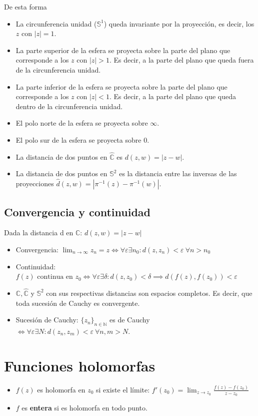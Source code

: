 \documentclass[paper=a4, fontsize=11pt]{scrartcl}
\numberwithin{equation}{section}
\numberwithin{figure}{section}
\numberwithin{table}{section}
\begin{document}
De esta forma
\begin{itemize}
\item La circunferencia unidad ($\mathbb{S}^1$) queda invariante por la proyección, es decir, los $z$ con $|z|=1$.
\item La parte superior de la esfera se proyecta sobre la parte del plano que corresponde a los $z$ con $|z|>1$. Es decir, a la parte del plano que queda fuera de la circunferencia unidad.
\item La parte inferior de la esfera se proyecta sobre la parte del plano que corresponde a los $z$ con $|z|<1$. Es decir, a la parte del plano que queda dentro de la circunferencia unidad.
\item El polo norte de la esfera se proyecta sobre $\infty$.
\item El polo sur de la esfera se proyecta sobre $0$.
\item La distancia de dos puntos en $\hat{\mathbb{C}}$ es $d(z,w)=|z-w|$.
\item La distancia de dos puntos en $\mathbb{S}^2$ es la distancia entre las inversas de las proyecciones $\hat{d}(z,w)=|\pi^{-1}(z)-\pi^{-1}(w)|$.
\end{itemize}

\newpage
\subsection{Convergencia y continuidad}
Dada la distancia d en $\mathbb{C}$: $d(z,w)=|z-w|$
\begin{itemize}
\item Convergencia: $\boxed{\lim_{n\to\infty}{z_n}=z \iff \forall\varepsilon\exists n_0: d(z,z_n)<\varepsilon \ \forall n>n_0}$
\item Continuidad: $\boxed{f(z)\text{ continua en } z_0 \iff \forall \varepsilon \exists \delta: d(z,z_0)<\delta \implies d(f(z), f(z_0))<\varepsilon}$
\item $\mathbb{C}, \hat{\mathbb{C}}$ y $\mathbb{S}^2$ con sus respectivas distancias son espacios completos. Es decir, que toda sucesión de Cauchy es convergente.
\item Sucesión de Cauchy: $\{z_n\}_{n\in\mathbb{N}}$ es de Cauchy $\iff \forall\varepsilon \exists N: d(z_n,z_m)<\varepsilon\ \forall n,m > N$.
\end{itemize}

\newpage
\section{Funciones holomorfas}
\begin{itemize}
\item $f(z)$ es holomorfa en $z_0$ si existe el límite: $\boxed{f'(z_0) = \lim_{z\to z_0}\frac{f(z)-f(z_0)}{z-z_0}}$
\item $f$ es \textbf{entera} si es holomorfa en todo punto.
\end{itemize}
\end{document}
